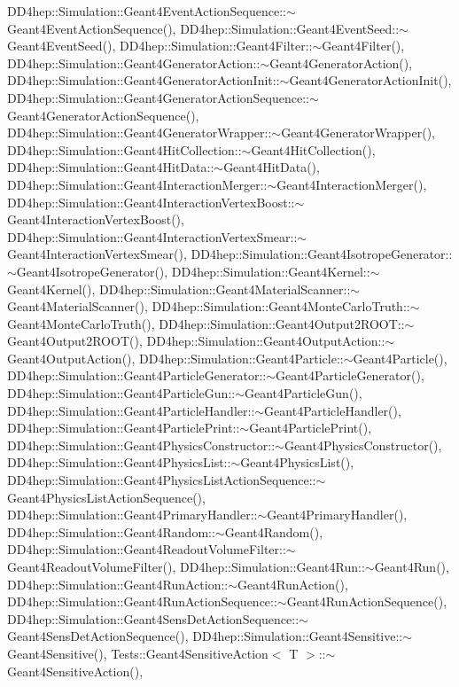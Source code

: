 D\+D4hep\+::\+Simulation\+::\+Geant4\+Event\+Action\+Sequence\+::$\sim$\+Geant4\+Event\+Action\+Sequence(), D\+D4hep\+::\+Simulation\+::\+Geant4\+Event\+Seed\+::$\sim$\+Geant4\+Event\+Seed(), D\+D4hep\+::\+Simulation\+::\+Geant4\+Filter\+::$\sim$\+Geant4\+Filter(), D\+D4hep\+::\+Simulation\+::\+Geant4\+Generator\+Action\+::$\sim$\+Geant4\+Generator\+Action(), D\+D4hep\+::\+Simulation\+::\+Geant4\+Generator\+Action\+Init\+::$\sim$\+Geant4\+Generator\+Action\+Init(), D\+D4hep\+::\+Simulation\+::\+Geant4\+Generator\+Action\+Sequence\+::$\sim$\+Geant4\+Generator\+Action\+Sequence(), D\+D4hep\+::\+Simulation\+::\+Geant4\+Generator\+Wrapper\+::$\sim$\+Geant4\+Generator\+Wrapper(), D\+D4hep\+::\+Simulation\+::\+Geant4\+Hit\+Collection\+::$\sim$\+Geant4\+Hit\+Collection(), D\+D4hep\+::\+Simulation\+::\+Geant4\+Hit\+Data\+::$\sim$\+Geant4\+Hit\+Data(), D\+D4hep\+::\+Simulation\+::\+Geant4\+Interaction\+Merger\+::$\sim$\+Geant4\+Interaction\+Merger(), D\+D4hep\+::\+Simulation\+::\+Geant4\+Interaction\+Vertex\+Boost\+::$\sim$\+Geant4\+Interaction\+Vertex\+Boost(), D\+D4hep\+::\+Simulation\+::\+Geant4\+Interaction\+Vertex\+Smear\+::$\sim$\+Geant4\+Interaction\+Vertex\+Smear(), D\+D4hep\+::\+Simulation\+::\+Geant4\+Isotrope\+Generator\+::$\sim$\+Geant4\+Isotrope\+Generator(), D\+D4hep\+::\+Simulation\+::\+Geant4\+Kernel\+::$\sim$\+Geant4\+Kernel(), D\+D4hep\+::\+Simulation\+::\+Geant4\+Material\+Scanner\+::$\sim$\+Geant4\+Material\+Scanner(), D\+D4hep\+::\+Simulation\+::\+Geant4\+Monte\+Carlo\+Truth\+::$\sim$\+Geant4\+Monte\+Carlo\+Truth(), D\+D4hep\+::\+Simulation\+::\+Geant4\+Output2\+R\+O\+O\+T\+::$\sim$\+Geant4\+Output2\+R\+O\+O\+T(), D\+D4hep\+::\+Simulation\+::\+Geant4\+Output\+Action\+::$\sim$\+Geant4\+Output\+Action(), D\+D4hep\+::\+Simulation\+::\+Geant4\+Particle\+::$\sim$\+Geant4\+Particle(), D\+D4hep\+::\+Simulation\+::\+Geant4\+Particle\+Generator\+::$\sim$\+Geant4\+Particle\+Generator(), D\+D4hep\+::\+Simulation\+::\+Geant4\+Particle\+Gun\+::$\sim$\+Geant4\+Particle\+Gun(), D\+D4hep\+::\+Simulation\+::\+Geant4\+Particle\+Handler\+::$\sim$\+Geant4\+Particle\+Handler(), D\+D4hep\+::\+Simulation\+::\+Geant4\+Particle\+Print\+::$\sim$\+Geant4\+Particle\+Print(), D\+D4hep\+::\+Simulation\+::\+Geant4\+Physics\+Constructor\+::$\sim$\+Geant4\+Physics\+Constructor(), D\+D4hep\+::\+Simulation\+::\+Geant4\+Physics\+List\+::$\sim$\+Geant4\+Physics\+List(), D\+D4hep\+::\+Simulation\+::\+Geant4\+Physics\+List\+Action\+Sequence\+::$\sim$\+Geant4\+Physics\+List\+Action\+Sequence(), D\+D4hep\+::\+Simulation\+::\+Geant4\+Primary\+Handler\+::$\sim$\+Geant4\+Primary\+Handler(), D\+D4hep\+::\+Simulation\+::\+Geant4\+Random\+::$\sim$\+Geant4\+Random(), D\+D4hep\+::\+Simulation\+::\+Geant4\+Readout\+Volume\+Filter\+::$\sim$\+Geant4\+Readout\+Volume\+Filter(), D\+D4hep\+::\+Simulation\+::\+Geant4\+Run\+::$\sim$\+Geant4\+Run(), D\+D4hep\+::\+Simulation\+::\+Geant4\+Run\+Action\+::$\sim$\+Geant4\+Run\+Action(), D\+D4hep\+::\+Simulation\+::\+Geant4\+Run\+Action\+Sequence\+::$\sim$\+Geant4\+Run\+Action\+Sequence(), D\+D4hep\+::\+Simulation\+::\+Geant4\+Sens\+Det\+Action\+Sequence\+::$\sim$\+Geant4\+Sens\+Det\+Action\+Sequence(), D\+D4hep\+::\+Simulation\+::\+Geant4\+Sensitive\+::$\sim$\+Geant4\+Sensitive(), Tests\+::\+Geant4\+Sensitive\+Action$<$ T $>$\+::$\sim$\+Geant4\+Sensitive\+Action(), 